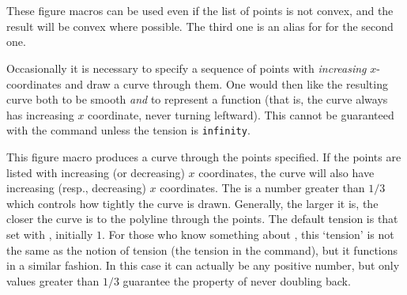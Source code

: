 \documentclass[letterpaper]{article}
\begin{document}
\begin{cd}
\\
\\
%
%
%
%
\end{cd}

These figure macros can be used even if the list of points is not
convex, and the result will be convex where possible. The third one is
an alias for for the second one.

\medskip
Occasionally it is necessary to specify a sequence of points with
\emph{increasing} $x$-coordinates and draw a curve through them. One
would then like the resulting curve both to be smooth \textit{and} to
represent a function (that is, the curve always has increasing $x$
coordinate, never turning leftward). This cannot be guaranteed with the
 command unless the tension is \texttt{infinity}.

\begin{cd}
%
%
\end{cd}

This figure macro produces a curve through the points specified. If the
points are listed with increasing (or decreasing) $x$ coordinates, the
curve will also have increasing (resp., decreasing) $x$ coordinates. The
 is a number greater than $1/3$ which controls how tightly
the curve is drawn. Generally, the larger it is, the closer the curve is
to the polyline through the points. The default tension is that set with
, initially $1$. For those who know something about
\MF{}, this `tension' is not the same as the \MF{} notion of tension
(the tension in the  command), but it functions in a similar
fashion. In this case it can actually be any positive number, but only
values greater than $1/3$ guarantee the property of never doubling back.

\begin{cd}
%
%
\end{cd}
\end{document}
